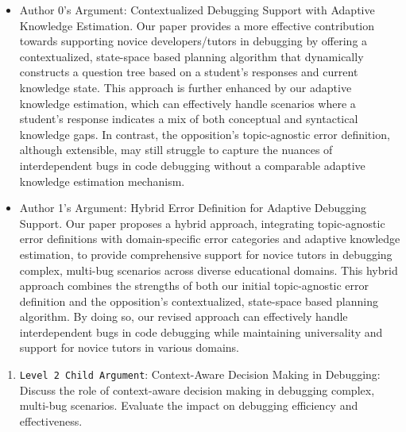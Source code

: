 \begin{enumerate}
\begin{enumerate}
        \begin{itemize}
            \item Author 0's Argument: Contextualized Debugging Support with Adaptive Knowledge Estimation. Our paper provides a more effective contribution towards supporting novice developers/tutors in debugging by offering a contextualized, state-space based planning algorithm that dynamically constructs a question tree based on a student's responses and current knowledge state. This approach is further enhanced by our adaptive knowledge estimation, which can effectively handle scenarios where a student's response indicates a mix of both conceptual and syntactical knowledge gaps. In contrast, the opposition's topic-agnostic error definition, although extensible, may still struggle to capture the nuances of interdependent bugs in code debugging without a comparable adaptive knowledge estimation mechanism.
		\item Author 1's Argument: Hybrid Error Definition for Adaptive Debugging Support. Our paper proposes a hybrid approach, integrating topic-agnostic error definitions with domain-specific error categories and adaptive knowledge estimation, to provide comprehensive support for novice tutors in debugging complex, multi-bug scenarios across diverse educational domains. This hybrid approach combines the strengths of both our initial topic-agnostic error definition and the opposition's contextualized, state-space based planning algorithm. By doing so, our revised approach can effectively handle interdependent bugs in code debugging while maintaining universality and support for novice tutors in various domains.
        \end{itemize}
    \end{enumerate}

    \begin{enumerate}
        \item \texttt{Level 2 Child Argument}: Context-Aware Decision Making in Debugging: Discuss the role of context-aware decision making in debugging complex, multi-bug scenarios. Evaluate the impact on debugging efficiency and effectiveness.


\end{enumerate}
\end{enumerate}
